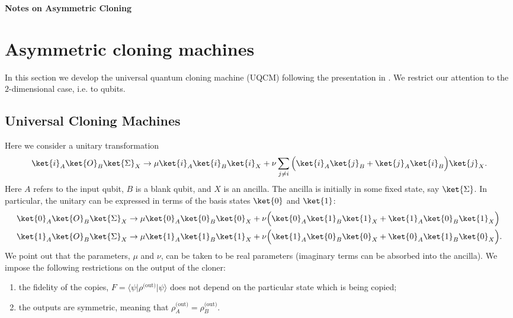 \documentclass[reqno]{amsart}
\numberwithin{lemma}{section}
\numberwithin{proposition}{section}
\begin{document}
\begin{center}
    \textbf{Notes on Asymmetric Cloning}
\end{center}

\section{Asymmetric cloning machines}

In this section we develop the universal quantum cloning machine (UQCM) following the presentation in \cite{REZAKHANI2005278}. We restrict our attention to the $2$-dimensional case, i.e. to qubits.

\subsection{Universal Cloning Machines}
Here we consider a unitary transformation
\begin{equation*}
    \ket{i}_{A} \ket{O}_{B} \ket{\Sigma}_{X} \to \mu \ket{i}_{A} \ket{i}_{B} \ket{i}_{X} + \nu \sum_{j \neq i} \Big ( \ket{i}_{A} \ket{j}_{B} + \ket{j}_{A} \ket{i}_{B} \Big ) \ket{j}_{X}.
\end{equation*}
Here $A$ refers to the input qubit, $B$ is a blank qubit, and $X$ is an ancilla. The ancilla is initially in some fixed state, say $\ket{\Sigma}$. In particular, the unitary can be expressed in terms of the basis states $\ket{0}$ and $\ket{1}$:
\begin{equation}
	\label{UCM}
	\begin{aligned}
    \ket{0}_{A} \ket{O}_{B} \ket{\Sigma}_{X} &\to \mu \ket{0}_{A} \ket{0}_{B} \ket{0}_{X} + \nu \Big ( \ket{0}_{A} \ket{1}_{B} \ket{1}_{X} + \ket{1}_{A} \ket{0}_{B} \ket{1}_{X} \Big )\\
    \ket{1}_{A} \ket{O}_{B} \ket{\Sigma}_{X} &\to \mu \ket{1}_{A} \ket{1}_{B} \ket{1}_{X} + \nu \Big ( \ket{1}_{A} \ket{0}_{B} \ket{0}_{X} + \ket{0}_{A} \ket{1}_{B} \ket{0}_{X} \Big ).
    \end{aligned}
\end{equation}
We point out that the parameters, $\mu$ and $\nu$, can be taken to be real parameters (imaginary terms can be absorbed into the ancilla). We impose the following restrictions on the output of the cloner:
\begin{enumerate}
    \item the fidelity of the copies, $F = \langle \psi \vert \rho^{\text{(out)}} \vert \psi \rangle$ does not depend on the particular state which is being copied;
    \item the outputs are symmetric, meaning that $\rho_{A}^{\text{(out)}} = \rho_{B}^{\text{(out)}}$.
\end{enumerate}
\end{document}
